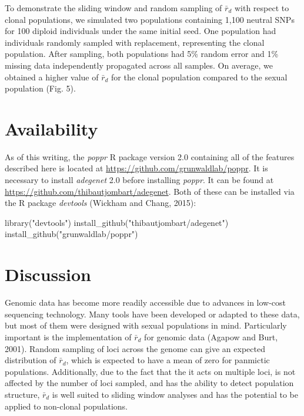 \documentclass{frontiersSCNS} %
\newenvironment{CodeChunk}{}{}
\begin{document}
To demonstrate the sliding window and random sampling of \(\bar{r}_d\)
with respect to clonal populations, we simulated two populations
containing 1,100 neutral SNPs for 100 diploid individuals under the same
initial seed. One population had individuals randomly sampled with
replacement, representing the clonal population. After sampling, both
populations had 5\% random error and 1\% missing data independently
propagated across all samples. On average, we obtained a higher value of
\(\bar{r}_d\) for the clonal population compared to the sexual
population (Fig. 5).

\section*{Availability}\label{availability}

As of this writing, the \emph{poppr} R package version 2.0 containing
all of the features described here is located at
\url{https://github.com/grunwaldlab/poppr}. It is necessary to install
\emph{adegenet} 2.0 before installing \emph{poppr}. It can be found at
\url{https://github.com/thibautjombart/adegenet}. Both of these can be
installed via the R package \emph{devtools} (Wickham and Chang, 2015):

\begin{CodeChunk}
\begin{CodeInput}
library("devtools")
install_github("thibautjombart/adegenet")
install_github("grunwaldlab/poppr")
\end{CodeInput}
\end{CodeChunk}

\section*{Discussion}\label{discussion}

Genomic data has become more readily accessible due to advances in
low-cost sequencing technology. Many tools have been developed or
adapted to these data, but most of them were designed with sexual
populations in mind. Particularly important is the implementation of
\(\bar{r}_d\) for genomic data (Agapow and Burt, 2001). Random sampling
of loci across the genome can give an expected distribution of
\(\bar{r}_d\), which is expected to have a mean of zero for panmictic
populations. Additionally, due to the fact that the it acts on multiple
loci, is not affected by the number of loci sampled, and has the ability
to detect population structure, \(\bar{r}_d\) is well suited to sliding
window analyses and has the potential to be applied to non-clonal
populations.
\end{document}
